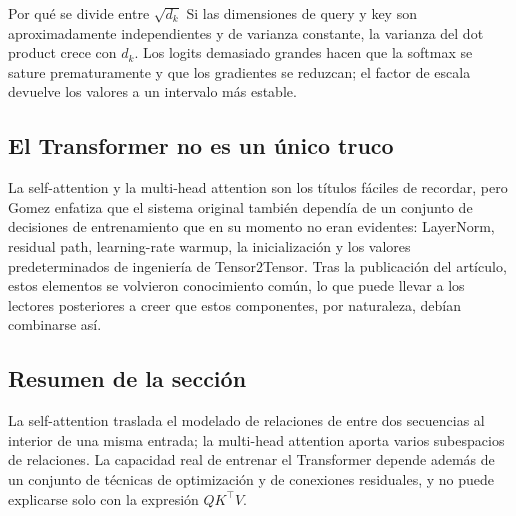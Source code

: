 \begin{knowledgebox}{Por qué se divide entre $\sqrt{d_k}$}
Si las dimensiones de query y key son aproximadamente independientes y de varianza constante, la varianza del dot product crece con $d_k$. Los logits demasiado grandes hacen que la softmax se sature prematuramente y que los gradientes se reduzcan; el factor de escala devuelve los valores a un intervalo más estable.
\end{knowledgebox}

\subsection{El Transformer no es un único truco}

La self-attention y la multi-head attention son los títulos fáciles de recordar, pero Gomez enfatiza que el sistema original también dependía de un conjunto de decisiones de entrenamiento que en su momento no eran evidentes: LayerNorm, residual path, learning-rate warmup, la inicialización y los valores predeterminados de ingeniería de Tensor2Tensor. Tras la publicación del artículo, estos elementos se volvieron conocimiento común, lo que puede llevar a los lectores posteriores a creer que estos componentes, por naturaleza, debían combinarse así.



\subsection{Resumen de la sección}

La self-attention traslada el modelado de relaciones de entre dos secuencias al interior de una misma entrada; la multi-head attention aporta varios subespacios de relaciones. La capacidad real de entrenar el Transformer depende además de un conjunto de técnicas de optimización y de conexiones residuales, y no puede explicarse solo con la expresión $QK^{\top}V$.
